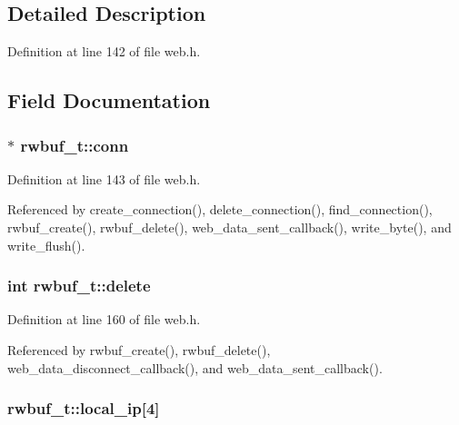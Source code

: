 \subsection{Detailed Description}


Definition at line 142 of file web.\+h.



\subsection{Field Documentation}
\subsubsection[{\texorpdfstring{conn}{conn}}]{$\ast$ rwbuf\+\_\+t\+::conn}\hypertarget{structrwbuf__t_a15785240e32c27f7af7c4b0cb1a6e39b}{}\label{structrwbuf__t_a15785240e32c27f7af7c4b0cb1a6e39b}


Definition at line 143 of file web.\+h.



Referenced by create\+\_\+connection(), delete\+\_\+connection(), find\+\_\+connection(), rwbuf\+\_\+create(), rwbuf\+\_\+delete(), web\+\_\+data\+\_\+sent\+\_\+callback(), write\+\_\+byte(), and write\+\_\+flush().

\subsubsection[{\texorpdfstring{delete}{delete}}]{\setlength{\rightskip}{0pt plus 5cm}int rwbuf\+\_\+t\+::delete}\hypertarget{structrwbuf__t_a54e278f96a331cf0a61d22094c4b9f87}{}\label{structrwbuf__t_a54e278f96a331cf0a61d22094c4b9f87}


Definition at line 160 of file web.\+h.



Referenced by rwbuf\+\_\+create(), rwbuf\+\_\+delete(), web\+\_\+data\+\_\+disconnect\+\_\+callback(), and web\+\_\+data\+\_\+sent\+\_\+callback().

\subsubsection[{\texorpdfstring{local\+\_\+ip}{local_ip}}]{ rwbuf\+\_\+t\+::local\+\_\+ip\mbox{[}4\mbox{]}}\hypertarget{structrwbuf__t_aa26b4813db79aeaa293bb1eadfde0b54}{}\label{structrwbuf__t_aa26b4813db79aeaa293bb1eadfde0b54}


